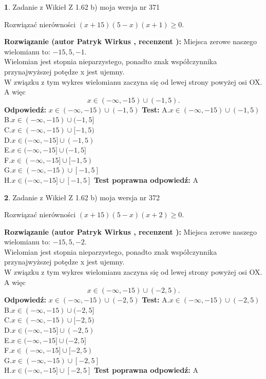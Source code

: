 \documentclass[12pt, a4paper]{article}
\theoremstyle{definition} %
\newtheorem{zad}{}
\newcommand{\zadStart}[1]{\begin{zad}#1\newline}
\newcommand{\zadStop}{\end{zad}}
\newcommand{\rozwStart}[2]{\noindent \textbf{Rozwiązanie (autor #1 , recenzent #2): }\newline}
\newcommand{\rozwStop}{\newline}
\newcommand{\odpStart}{\noindent \textbf{Odpowiedź:}\newline}
\newcommand{\odpStop}{\newline}
\newcommand{\testStart}{\noindent \textbf{Test:}\newline}
\newcommand{\testStop}{\newline}
\newcommand{\kluczStart}{\noindent \textbf{Test poprawna odpowiedź:}\newline}
\newcommand{\kluczStop}{\newline}
\begin{document}
\zadStart{Zadanie z Wikieł Z 1.62 b) moja wersja nr 371}

Rozwiązać nierówności $(x+15)(5-x)(x+1)\ge0$.
\zadStop
\rozwStart{Patryk Wirkus}{}
Miejsca zerowe naszego wielomianu to: $-15, 5, -1$.\\
Wielomian jest stopnia nieparzystego, ponadto znak współczynnika przy\linebreak najwyższej potędze x jest ujemny.\\ W związku z tym wykres wielomianu zaczyna się od lewej strony powyżej osi OX. A więc $$x \in (-\infty,-15) \cup (-1,5).$$
\rozwStop
\odpStart
$x \in (-\infty,-15) \cup (-1,5)$
\odpStop
\testStart
A.$x \in (-\infty,-15) \cup (-1,5)$\\
B.$x \in (-\infty,-15) \cup (-1,5]$\\
C.$x \in (-\infty,-15) \cup [-1,5)$\\
D.$x \in (-\infty,-15] \cup (-1,5)$\\
E.$x \in (-\infty,-15] \cup (-1,5]$\\
F.$x \in (-\infty,-15] \cup [-1,5)$\\
G.$x \in (-\infty,-15) \cup [-1,5]$\\
H.$x \in (-\infty,-15] \cup [-1,5]$
\testStop
\kluczStart
A
\kluczStop



\zadStart{Zadanie z Wikieł Z 1.62 b) moja wersja nr 372}

Rozwiązać nierówności $(x+15)(5-x)(x+2)\ge0$.
\zadStop
\rozwStart{Patryk Wirkus}{}
Miejsca zerowe naszego wielomianu to: $-15, 5, -2$.\\
Wielomian jest stopnia nieparzystego, ponadto znak współczynnika przy\linebreak najwyższej potędze x jest ujemny.\\ W związku z tym wykres wielomianu zaczyna się od lewej strony powyżej osi OX. A więc $$x \in (-\infty,-15) \cup (-2,5).$$
\rozwStop
\odpStart
$x \in (-\infty,-15) \cup (-2,5)$
\odpStop
\testStart
A.$x \in (-\infty,-15) \cup (-2,5)$\\
B.$x \in (-\infty,-15) \cup (-2,5]$\\
C.$x \in (-\infty,-15) \cup [-2,5)$\\
D.$x \in (-\infty,-15] \cup (-2,5)$\\
E.$x \in (-\infty,-15] \cup (-2,5]$\\
F.$x \in (-\infty,-15] \cup [-2,5)$\\
G.$x \in (-\infty,-15) \cup [-2,5]$\\
H.$x \in (-\infty,-15] \cup [-2,5]$
\testStop
\kluczStart
A
\kluczStop
\end{document}
